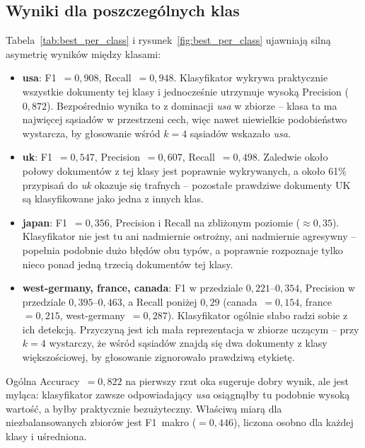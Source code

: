 \documentclass{article}
\begin{document}
\subsection{Wyniki dla poszczególnych klas}

Tabela~\ref{tab:best_per_class} i rysunek~\ref{fig:best_per_class} ujawniają
silną asymetrię wyników między klasami:

\begin{itemize}
    \item \textbf{usa}: F1~$=0{,}908$, Recall~$=0{,}948$. Klasyfikator wykrywa
    praktycznie wszystkie dokumenty tej klasy i jednocześnie utrzymuje wysoką
    Precision ($0{,}872$). Bezpośrednio wynika to z dominacji \textit{usa}
    w zbiorze -- klasa ta ma najwięcej sąsiadów w przestrzeni cech, więc nawet
    niewielkie podobieństwo wystarcza, by głosowanie wśród $k=4$ sąsiadów
    wskazało \textit{usa}.

    \item \textbf{uk}: F1~$=0{,}547$, Precision~$=0{,}607$, Recall~$=0{,}498$.
    Zaledwie około połowy dokumentów z tej klasy jest poprawnie wykrywanych,
    a około 61\% przypisań do \textit{uk} okazuje się trafnych -- pozostałe
    prawdziwe dokumenty UK są klasyfikowane jako jedna z innych klas.

    \item \textbf{japan}: F1~$=0{,}356$, Precision i Recall na zbliżonym
    poziomie ($\approx 0{,}35$). Klasyfikator nie jest tu ani nadmiernie
    ostrożny, ani nadmiernie agresywny -- popełnia podobnie dużo błędów obu
    typów, a poprawnie rozpoznaje tylko nieco ponad jedną trzecią dokumentów
    tej klasy.

    \item \textbf{west-germany, france, canada}: F1 w przedziale
    $0{,}221$--$0{,}354$, Precision w przedziale $0{,}395$--$0{,}463$,
    a Recall poniżej $0{,}29$ (canada~$=0{,}154$, france~$=0{,}215$,
    west-germany~$=0{,}287$). Klasyfikator ogólnie słabo radzi sobie
    z ich detekcją. Przyczyną jest ich mała reprezentacja
    w zbiorze uczącym -- przy $k=4$ wystarczy, że wśród sąsiadów znajdą się
    dwa dokumenty z klasy większościowej, by głosowanie zignorowało prawdziwą
    etykietę.
\end{itemize}

Ogólna Accuracy~$=0{,}822$ na pierwszy rzut oka sugeruje dobry wynik, ale jest
myląca: klasyfikator zawsze odpowiadający \textit{usa} osiągnąłby tu podobnie
wysoką wartość, a byłby praktycznie bezużyteczny. Właściwą miarą dla
niezbalansowanych zbiorów jest F1~makro ($=0{,}446$), liczona osobno dla każdej
klasy i uśredniona.
\end{document}
